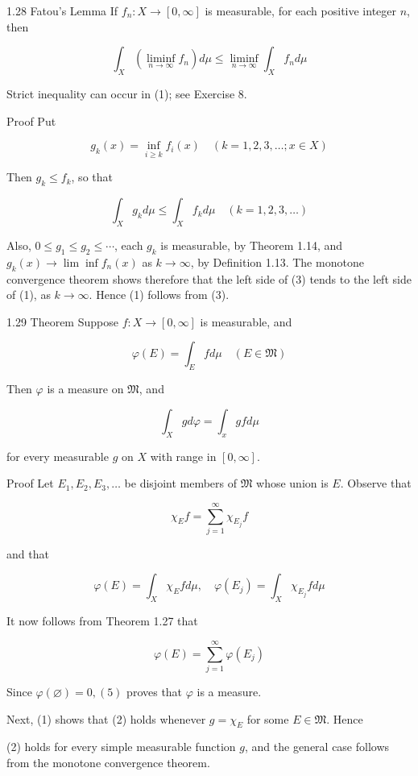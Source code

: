 \documentclass[10pt]{article}
\begin{document}
1.28 Fatou's Lemma If $f_{n}: X \rightarrow[0, \infty]$ is measurable, for each positive integer $n$, then

$$
\int_{X}\left(\liminf _{n \rightarrow \infty} f_{n}\right) d \mu \leq \liminf _{n \rightarrow \infty} \int_{X} f_{n} d \mu
$$

Strict inequality can occur in (1); see Exercise 8.

Proof Put

$$
g_{k}(x)=\inf _{i \geq k} f_{i}(x) \quad(k=1,2,3, \ldots ; x \in X)
$$

Then $g_{k} \leq f_{k}$, so that

$$
\int_{X} g_{k} d \mu \leq \int_{X} f_{k} d \mu \quad(k=1,2,3, \ldots)
$$

Also, $0 \leq g_{1} \leq g_{2} \leq \cdots$, each $g_{k}$ is measurable, by Theorem 1.14, and $g_{k}(x) \rightarrow \lim \inf f_{n}(x)$ as $k \rightarrow \infty$, by Definition 1.13. The monotone convergence theorem shows therefore that the left side of (3) tends to the left side of (1), as $k \rightarrow \infty$. Hence (1) follows from (3).

1.29 Theorem Suppose $f: X \rightarrow[0, \infty]$ is measurable, and

$$
\varphi(E)=\int_{E} f d \mu \quad(E \in \mathfrak{M})
$$

Then $\varphi$ is a measure on $\mathfrak{M}$, and

$$
\int_{X} g d \varphi=\int_{x} g f d \mu
$$

for every measurable $g$ on $X$ with range in $[0, \infty]$.

Proof Let $E_{1}, E_{2}, E_{3}, \ldots$ be disjoint members of $\mathfrak{M}$ whose union is $E$. Observe that

$$
\chi_{E} f=\sum_{j=1}^{\infty} \chi_{E_{j}} f
$$

and that

$$
\varphi(E)=\int_{X} \chi_{E} f d \mu, \quad \varphi\left(E_{j}\right)=\int_{X} \chi_{E_{j}} f d \mu
$$

It now follows from Theorem 1.27 that

$$
\varphi(E)=\sum_{j=1}^{\infty} \varphi\left(E_{j}\right)
$$

Since $\varphi(\varnothing)=0,(5)$ proves that $\varphi$ is a measure.

Next, (1) shows that (2) holds whenever $g=\chi_{E}$ for some $E \in \mathfrak{M}$. Hence

(2) holds for every simple measurable function $g$, and the general case follows from the monotone convergence theorem.
\end{document}
